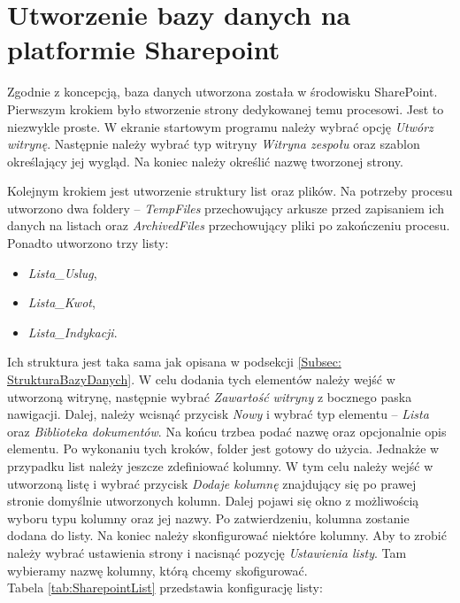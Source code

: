 \section{Utworzenie bazy danych na platformie Sharepoint}

Zgodnie z koncepcją, baza danych utworzona została w środowisku SharePoint.
Pierwszym krokiem było stworzenie strony dedykowanej temu procesowi. Jest to niezwykle proste. W ekranie startowym programu należy wybrać opcję \emph{Utwórz witrynę}. Następnie należy wybrać typ witryny \emph{Witryna zespołu} oraz szablon określający jej wygląd. Na koniec należy określić nazwę tworzonej strony.

Kolejnym krokiem jest utworzenie struktury list oraz plików. Na potrzeby procesu utworzono dwa foldery -- \emph{TempFiles} przechowujący arkusze przed zapisaniem ich danych na listach oraz \emph{ArchivedFiles} przechowujący pliki po zakończeniu procesu.
Ponadto utworzono trzy listy:
\begin{itemize}
    \item \emph{Lista\_Uslug},
    \item \emph{Lista\_Kwot},
    \item \emph{Lista\_Indykacji}.
\end{itemize}
Ich struktura jest taka sama jak opisana w podsekcji \ref{Subsec: StrukturaBazyDanych}. 
W celu dodania tych elementów należy wejść w utworzoną witrynę, następnie wybrać \emph{Zawartość witryny} z bocznego paska nawigacji. Dalej, należy wcisnąć przycisk \emph{Nowy} i wybrać typ elementu -- \emph{Lista} oraz \emph{Biblioteka dokumentów}. Na końcu trzbea podać nazwę oraz opcjonalnie opis elementu.
Po wykonaniu tych kroków, folder jest gotowy do użycia. Jednakże w przypadku list należy jeszcze zdefiniować kolumny. W tym celu należy wejść w utworzoną listę i wybrać przycisk \emph{Dodaje kolumnę} znajdujący się po prawej stronie domyślnie utworzonych kolumn. Dalej pojawi się okno z możliwością wyboru typu kolumny oraz jej nazwy. Po zatwierdzeniu, kolumna zostanie dodana do listy.
Na koniec należy skonfigurować niektóre kolumny. Aby to zrobić należy wybrać ustawienia strony i nacisnąć pozycję \emph{Ustawienia listy}. Tam wybieramy nazwę kolumny, którą chcemy skofigurować.\\
Tabela \ref{tab:SharepointList} przedstawia konfigurację listy:
